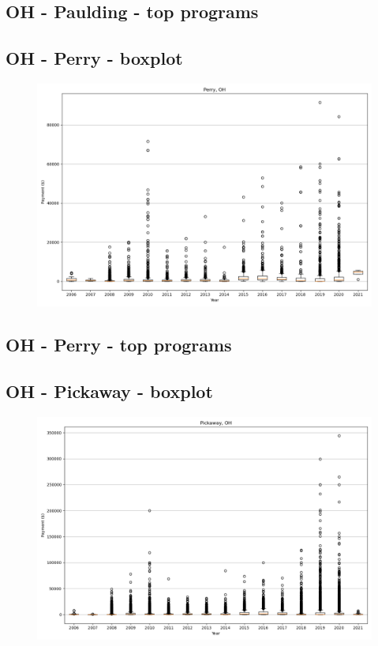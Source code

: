 \subsection*{OH - Paulding - top programs}

\newpage
\subsection*{OH - Perry - boxplot}
\begin{figure}[h]
\centering
\includegraphics[width=7in]{../output/boxplots/counties/Perry-OH_boxplot.png}
\end{figure}


\subsection*{OH - Perry - top programs}

\newpage
\subsection*{OH - Pickaway - boxplot}
\begin{figure}[h]
\centering
\includegraphics[width=7in]{../output/boxplots/counties/Pickaway-OH_boxplot.png}
\end{figure}


